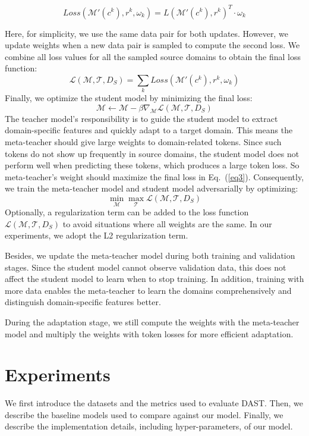 \documentclass[letterpaper]{article}
\begin{document}
$$Loss(\mathcal{M'}(c^k),{r}^k,\omega_k)={\mathit{L}(\mathcal{M'}(c^k),{r}^k)}^T\cdot \omega_k$$

Here, for simplicity, we use the same data pair for both updates. However, we update weights when a new data pair is sampled to compute the second loss.
We combine all loss values for all the sampled source domains to obtain the final loss function:
\begin{equation}\label{eq3}
\mathscr{L}(\mathcal{M},\mathcal{T}, D_S)=\sum_k \mathit{Loss}(\mathcal{M}'( c^k), {r}^k, \omega_k)
\end{equation}
Finally, we optimize the student model by minimizing the final loss:
$$\mathcal{M} \leftarrow \mathcal{M} - \beta \nabla_{\mathcal{M}} \mathscr{L}(\mathcal{M},\mathcal{T}, D_S)$$
The teacher model's responsibility is to guide the student model to extract domain-specific features and quickly adapt to a target domain.
This means the meta-teacher should give large weights to domain-related tokens. Since such tokens do not show up frequently in source domains, the student model does not perform well when predicting these tokens, which produces a large token loss.
So meta-teacher's weight should maximize the final loss in Eq.~(\ref{eq3}).
Consequently, we train the meta-teacher model and student model adversarially by optimizing:
$$\min_{\mathcal{M}}\max_{\mathcal{T}}\mathscr{L}(\mathcal{M},\mathcal{T}, D_S)$$
Optionally, a regularization term can be added to the loss function $\mathscr{L}(\mathcal{M},\mathcal{T}, D_S)$ to avoid situations where all weights are the same. In our experiments, we adopt the L2 regularization term.

Besides, we update the meta-teacher model during both training and validation stages. Since the student model cannot observe validation data, this does not affect the student model to learn when to stop training. In addition, training with more data enables the meta-teacher to learn the domains comprehensively and distinguish domain-specific features better.

During the adaptation stage, we still compute the weights with the meta-teacher model and multiply the weights with token losses for more efficient adaptation.







\section*{Experiments}
We first introduce the datasets and the metrics used to evaluate DAST. Then, we describe the baseline models used to compare against our model. Finally, we describe the implementation details, including hyper-parameters, of our model.
\end{document}
